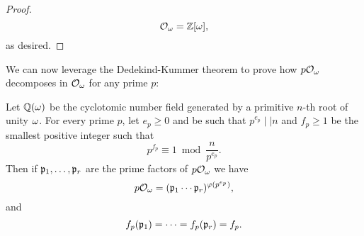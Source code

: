 \begin{proof}
      \[
        \mathcal{O}_{\omega} = \mathbb{Z}[\omega],
      \]
      as desired.
    \end{proof}

    We can now leverage the Dedekind-Kummer theorem to prove how $p\mathcal{O}_{\omega}$ decomposes in $\mathcal{O}_{\omega}$ for any prime $p$:

    \begin{proposition}
      Let $\mathbb{Q}(\omega)$ be the cyclotomic number field generated by a primitive $n$-th root of unity $\omega$. For every prime $p$, let $e_{p} \ge 0$ and  be such that $p^{e_{p}} \mid\mid n$ and $f_{p} \ge 1$ be the smallest positive integer such that
      \[
        p^{f_{p}} \equiv 1 \bmod{\frac{n}{p^{e_{p}}}}.
      \]
      Then if $\mathfrak{p}_{1},\ldots,\mathfrak{p}_{r}$ are the prime factors of $p\mathcal{O}_{\omega}$ we have
      \[
        p\mathcal{O}_{\omega} = (\mathfrak{p}_{1} \cdots \mathfrak{p}_{r})^{\varphi(p^{e_{p}})},
      \]
      and
      \[
        f_{p}(\mathfrak{p}_{1}) = \cdots = f_{p}(\mathfrak{p}_{r}) = f_{p}.
      \]
    \end{proposition}
